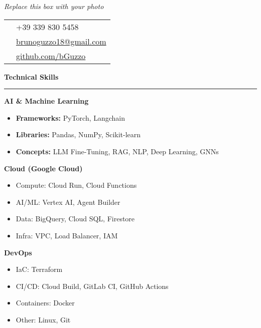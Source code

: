 \documentclass[9pt, a4paper]{article}
\newcommand{\cvsection}[1]{%
	\vspace{8pt}\par
	{\Large\bfseries\color{sectionblue}#1}\par
	\vspace{2pt}\hrule\vspace{6pt}
}
\begin{document}
	\begin{minipage}[t]{0.27\linewidth}
		\vspace{0pt} %
		
		\begin{center}
			\fbox{\rule{0pt}{4.5cm}\hspace{4.5cm}}\par
			\small\textit{Replace this box with your photo}
		\end{center}
		\vspace{8pt}
		
		\begin{tabularx}{\linewidth}{@{}lX@{}}
			\faPhone & +39 339 830 5458 \\
			\faEnvelope & \href{mailto:brunoguzzo18@gmail.com}{brunoguzzo18@gmail.com} \\
			\faGithub & \href{https://github.com/bGuzzo}{github.com/bGuzzo} \\
		\end{tabularx}
		
		\cvsection{Technical Skills}
		
		{\bfseries AI \& Machine Learning}
		\begin{itemize}[leftmargin=*, nosep, itemsep=2pt]
			\item \textbf{Frameworks:} PyTorch, Langchain
			\item \textbf{Libraries:} Pandas, NumPy, Scikit-learn
			\item \textbf{Concepts:} LLM Fine-Tuning, RAG, NLP, Deep Learning, GNNs
		\end{itemize}
		
		{\bfseries Cloud (Google Cloud)}
		\begin{itemize}[leftmargin=*, nosep, itemsep=2pt]
			\item Compute: Cloud Run, Cloud Functions
			\item AI/ML: Vertex AI, Agent Builder
			\item Data: BigQuery, Cloud SQL, Firestore
			\item Infra: VPC, Load Balancer, IAM
		\end{itemize}
		
		{\bfseries DevOps}
		\begin{itemize}[leftmargin=*, nosep, itemsep=2pt]
			\item IaC: Terraform
			\item CI/CD: Cloud Build, GitLab CI, GitHub Actions
			\item Containers: Docker
			\item Other: Linux, Git
		\end{itemize}
		

\end{minipage}
\end{document}
